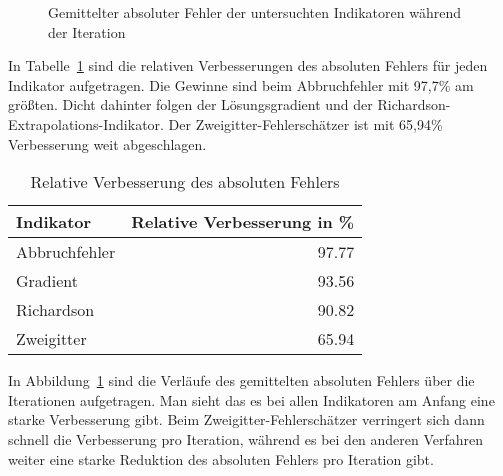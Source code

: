 \begin{figure}[h]
\centering
{}
\caption{Gemittelter absoluter Fehler der untersuchten Indikatoren während der Iteration}
\label{fig:it_all}
\end{figure}
\noindent
In Tabelle~\ref{tab:verb} sind die relativen Verbesserungen des absoluten Fehlers für jeden
Indikator aufgetragen. Die Gewinne sind beim Abbruchfehler mit 97,7\% am größten.
Dicht dahinter folgen der Lösungsgradient und der Richardson-Extrapolations-Indikator.
Der Zweigitter-Fehlerschätzer ist mit 65,94\% Verbesserung weit abgeschlagen.

\begin{table}[h]
  \begin{tabular}{l r}
  \toprule
  Indikator & Relative Verbesserung in \% \\
  \midrule
      Abbruchfehler & 97.77\\
      Gradient & 93.56\\
      Richardson & 90.82\\
      Zweigitter & 65.94\\
  \bottomrule
\end{tabular}
\caption{Relative Verbesserung des absoluten Fehlers}
\label{tab:verb}
\end{table}
\vspace{2cm}

In Abbildung~\ref{fig:it_all} sind die Verläufe des gemittelten absoluten
Fehlers über die Iterationen aufgetragen. Man sieht das es bei allen Indikatoren
am Anfang eine starke Verbesserung gibt. Beim Zweigitter-Fehlerschätzer
verringert sich dann schnell die Verbesserung pro Iteration, während es bei den anderen
Verfahren weiter eine starke Reduktion des absoluten Fehlers pro Iteration gibt.
